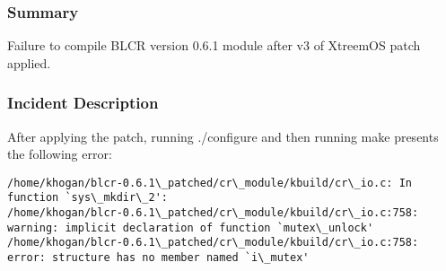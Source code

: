 







\subsubsection{Summary}
Failure to compile BLCR version 0.6.1 module after v3 of XtreemOS patch applied.

\subsubsection{Incident Description}
After applying the patch, running ./configure and then running make presents the following error:
\begin{lstlisting}
/home/khogan/blcr-0.6.1\_patched/cr\_module/kbuild/cr\_io.c: In function `sys\_mkdir\_2':
/home/khogan/blcr-0.6.1\_patched/cr\_module/kbuild/cr\_io.c:758: warning: implicit declaration of function `mutex\_unlock'
/home/khogan/blcr-0.6.1\_patched/cr\_module/kbuild/cr\_io.c:758: error: structure has no member named `i\_mutex'
\end{lstlisting}


